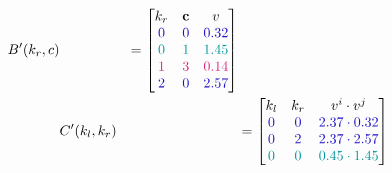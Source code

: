 \begin{figure}[H]
\begin{alignat*}{5}
         &         & \qquad \quad B'(k_r, c)   &                & = \begin{bmatrix}
                                                                        k_r                      & \textbf{c}               & v                           \\
                                                                        \color{blind-blue}0      & \color{blind-blue}0      & \color{blind-blue}0.32      \\
                                                                        \color{blind-turquoise}0 & \color{blind-turquoise}1 & \color{blind-turquoise}1.45 \\
                                                                        \color{blind-purple}1    & \color{blind-purple}3    & \color{blind-purple}0.14    \\
                                                                        \color{blind-blue}2      & \color{blind-blue}0      & \color{blind-blue}2.57      \\
                                                                    \end{bmatrix}
        \\
         &         &                           & C'(k_l, k_r)   &                                                                                      & = \begin{bmatrix}
                                                                                                                                                               k_l                      & k_r                      & v^i \cdot v^j                                \\
                                                                                                                                                               \color{blind-blue}0      & \color{blind-blue}0      & \mathcolor{blind-blue}{2.37 \cdot 0.32}      \\
                                                                                                                                                               \color{blind-blue}0      & \color{blind-blue}2      & \mathcolor{blind-blue}{2.37 \cdot 2.57}      \\
                                                                                                                                                               \color{blind-turquoise}0 & \color{blind-turquoise}0 & \mathcolor{blind-turquoise}{0.45 \cdot 1.45} \\

\end{bmatrix}
\end{alignat*}
\end{figure}
